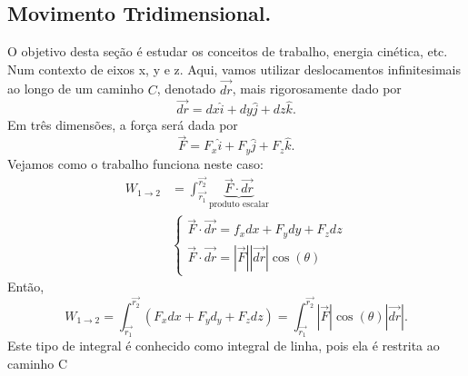 \documentclass{article}
\begin{document}
\subsection{Movimento Tridimensional.}
  O objetivo desta se\c cão é estudar os conceitos de trabalho, energia cinética,
etc. Num contexto de eixos x, y e z. Aqui, vamos utilizar deslocamentos infinitesimais
ao longo de um caminho \(C\), denotado \(\vec{dr}\), mais rigorosamente dado por 
  \[
    \vec{dr} = dx\hat{i} + dy\hat{j} + dz\hat{k}.
  \]
  Em três dimensões, a for\c ca será dada por 
    \[
      \vec{F} = F_{x}\hat{i} + F_{y}\hat{j} + F_{z}\hat{k}.
    \]
  Vejamos como o trabalho funciona neste caso: 
 \begin{align*}
   W_{1\rightarrow 2} &= \int_{\vec{r_{1}}}^{\vec{r_{2}}}\underbrace{\vec{F}\cdot \vec{dr}}_{\text{produto escalar}}\\
                      & \left\{\begin{array}{ll}
                          \vec{F}\cdot \vec{dr} = f_{x}dx + F_{y}dy + F_{z}dz\\
                          \vec{F}\cdot \vec{dr} = |\vec{F}||\vec{dr}|\cos{(\theta )}
                      \end{array}\right.
 \end{align*}
  Então, 
    \[
      W_{1\rightarrow 2} = \int_{\vec{r_{1}}}^{\vec{r_{2}}}(F_{x}dx + F_{y}d_{y} + F_{z}dz) = \int_{\vec{r_{1}}}^{\vec{r_{2}}}|\vec{F}|\cos{(\theta )}|\vec{dr}|.
    \]
  Este tipo de integral é conhecido como integral de linha, pois ela é restrita ao caminho 
  C

\begin{center}
\end{center}
\end{document}
